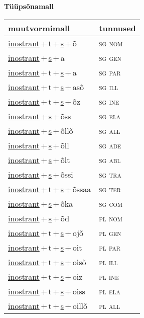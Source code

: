
\vspace{1.8em}
\begin{minipage}{\textwidth}
\textbf{Tüüpsõnamall \,}\\

\begin{sideways}
\begin{tabular}{l l}
muutvormimall & tunnused \\
\hline
\underline{inostrant}\,+\,t\,+\,\underline{s}\,+\,õ & \textsc{ sg nom } \\
\underline{inostrant}\,+\,\underline{s}\,+\,a & \textsc{ sg gen } \\
\underline{inostrant}\,+\,t\,+\,\underline{s}\,+\,a & \textsc{ sg par } \\
\underline{inostrant}\,+\,t\,+\,\underline{s}\,+\,asõ & \textsc{ sg ill } \\
\underline{inostrant}\,+\,t\,+\,\underline{s}\,+\,õz & \textsc{ sg ine } \\
\underline{inostrant}\,+\,\underline{s}\,+\,õss & \textsc{ sg ela } \\
\underline{inostrant}\,+\,\underline{s}\,+\,õllõ & \textsc{ sg all } \\
\underline{inostrant}\,+\,\underline{s}\,+\,õll & \textsc{ sg ade } \\
\underline{inostrant}\,+\,\underline{s}\,+\,õlt & \textsc{ sg abl } \\
\underline{inostrant}\,+\,\underline{s}\,+\,õssi & \textsc{ sg tra } \\
\underline{inostrant}\,+\,t\,+\,\underline{s}\,+\,õssaa & \textsc{ sg ter } \\
\underline{inostrant}\,+\,\underline{s}\,+\,õka & \textsc{ sg com } \\
\underline{inostrant}\,+\,\underline{s}\,+\,õd & \textsc{ pl nom } \\
\underline{inostrant}\,+\,t\,+\,\underline{s}\,+\,ojõ & \textsc{ pl gen } \\
\underline{inostrant}\,+\,t\,+\,\underline{s}\,+\,oit & \textsc{ pl par } \\
\underline{inostrant}\,+\,t\,+\,\underline{s}\,+\,oisõ & \textsc{ pl ill } \\
\underline{inostrant}\,+\,t\,+\,\underline{s}\,+\,oiz & \textsc{ pl ine } \\
\underline{inostrant}\,+\,t\,+\,\underline{s}\,+\,oiss & \textsc{ pl ela } \\
\underline{inostrant}\,+\,t\,+\,\underline{s}\,+\,oillõ & \textsc{ pl all } \\

\end{tabular}
\end{sideways}
\end{minipage}
